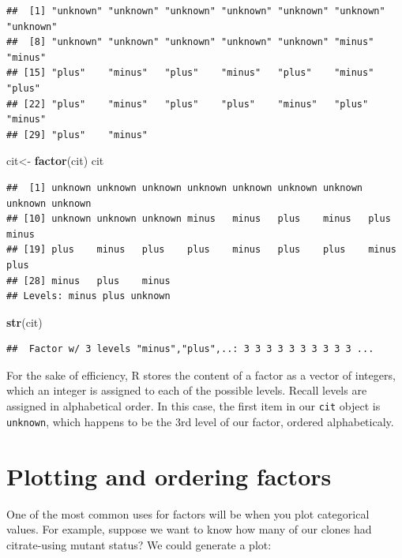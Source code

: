 \documentclass[
]{book}
\newenvironment{Shaded}{\begin{snugshade}}{\end{snugshade}}
\newcommand{\FunctionTok}[1]{\textcolor[rgb]{0.13,0.29,0.53}{\textbf{#1}}}
\newcommand{\NormalTok}[1]{#1}
\newcommand{\OtherTok}[1]{\textcolor[rgb]{0.56,0.35,0.01}{#1}}
\begin{document}
\begin{verbatim}
##  [1] "unknown" "unknown" "unknown" "unknown" "unknown" "unknown" "unknown"
##  [8] "unknown" "unknown" "unknown" "unknown" "unknown" "minus"   "minus"  
## [15] "plus"    "minus"   "plus"    "minus"   "plus"    "minus"   "plus"   
## [22] "plus"    "minus"   "plus"    "plus"    "minus"   "plus"    "minus"  
## [29] "plus"    "minus"
\end{verbatim}

\begin{Shaded}
\begin{Highlighting}[]
\NormalTok{cit}\OtherTok{\textless{}{-}} \FunctionTok{factor}\NormalTok{(cit)}
\NormalTok{cit}
\end{Highlighting}
\end{Shaded}

\begin{verbatim}
##  [1] unknown unknown unknown unknown unknown unknown unknown unknown unknown
## [10] unknown unknown unknown minus   minus   plus    minus   plus    minus  
## [19] plus    minus   plus    plus    minus   plus    plus    minus   plus   
## [28] minus   plus    minus  
## Levels: minus plus unknown
\end{verbatim}

\begin{Shaded}
\begin{Highlighting}[]
\FunctionTok{str}\NormalTok{(cit)}
\end{Highlighting}
\end{Shaded}

\begin{verbatim}
##  Factor w/ 3 levels "minus","plus",..: 3 3 3 3 3 3 3 3 3 3 ...
\end{verbatim}

For the sake of efficiency, R stores the content of a factor as a vector of integers, which an integer is assigned to each of the possible levels. Recall levels are assigned in alphabetical order. In this case, the first item in our \texttt{cit} object is \texttt{unknown}, which happens to be the 3rd level of our factor, ordered alphabeticaly.

\section{Plotting and ordering factors}\label{plotting-and-ordering-factors}

One of the most common uses for factors will be when you plot categorical values. For example, suppose we want to know how many of our clones had citrate-using mutant status? We could generate a plot:
\end{document}
